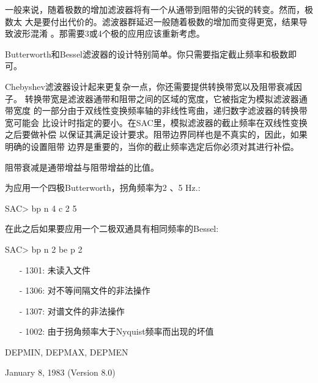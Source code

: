 一般来说，随着极数的增加滤波器将有一个从通带到阻带的尖锐的转变。然而，极数太
大是要付出代价的。滤波器群延迟一般随着极数的增加而变得更宽，结果导致波形混淆
。那需要3或4个极的应用应该重新考虑。

Butterworth和Bessel滤波器的设计特别简单。你只需要指定截止频率和极数即可。

Chebyshev滤波器设计起来更复杂一点，你还需要提供转换带宽以及阻带衰减因子。
转换带宽是滤波器通带和阻带之间的区域的宽度，它被指定为模拟滤波器通带宽度
的一部分由于双线性变换频率轴的非线性弯曲，递归数字滤波器的转换带宽可能会
比设计时指定的要小。在SAC里，模拟滤波器的截止频率在双线性变换之后要做补偿
以保证其满足设计要求。阻带边界同样也是不真实的，因此，如果明确的设置阻带
边界是重要的，当你的截止频率选定后你必须对其进行补偿。

阻带衰减是通带增益与阻带增益的比值。

为应用一个四极Butterworth，拐角频率为2 、5 Hz.:
\begin{SACCode}
SAC> bp n 4 c 2 5
\end{SACCode}

在此之后如果要应用一个二极双通具有相同频率的Bessel:
\begin{SACCode}
SAC> bp n 2 be p 2
\end{SACCode}

\begin{itemize}
\item[-]1301: 未读入文件
\item[-]1306: 对不等间隔文件的非法操作
\item[-]1307: 对谱文件的非法操作
\item[-]1002: 由于拐角频率大于Nyquist频率而出现的坏值
\end{itemize}

DEPMIN, DEPMAX, DEPMEN

January 8, 1983 (Version 8.0)
